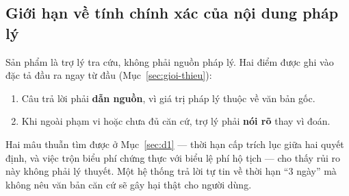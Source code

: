 \subsection{Giới hạn về tính chính xác của nội dung pháp lý}

Sản phẩm là trợ lý tra cứu, không phải nguồn pháp lý. Hai điểm được ghi vào đặc tả
đầu ra ngay từ đầu (Mục~\ref{sec:gioi-thieu}):

\begin{enumerate}[leftmargin=2em]
\item Câu trả lời phải \textbf{dẫn nguồn}, vì giá trị pháp lý thuộc về văn bản gốc.
\item Khi ngoài phạm vi hoặc chưa đủ căn cứ, trợ lý phải \textbf{nói rõ} thay vì
đoán.
\end{enumerate}

Hai mâu thuẫn tìm được ở Mục~\ref{sec:d1} --- thời hạn cấp trích lục giữa hai quyết
định, và việc trộn biểu phí chứng thực với biểu lệ phí hộ tịch --- cho thấy rủi ro
này không phải lý thuyết. Một hệ thống trả lời tự tin về thời hạn ``3 ngày'' mà
không nêu văn bản căn cứ sẽ gây hại thật cho người dùng.
